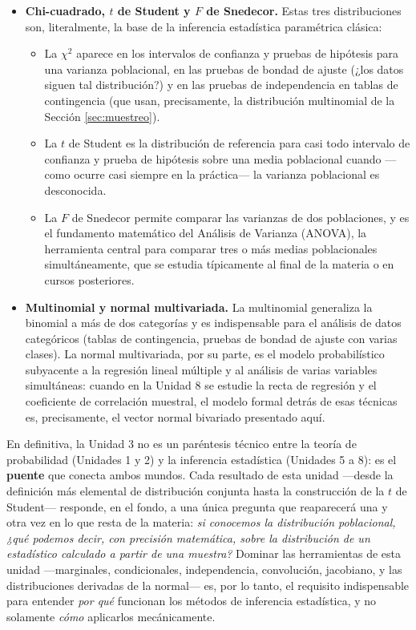 \documentclass[11pt,a4paper]{article}
\theoremstyle{plain}
\theoremstyle{definition}
\theoremstyle{remark}
\begin{document}
\begin{itemize}
\item \textbf{Chi-cuadrado, $t$ de Student y $F$ de Snedecor.} Estas tres distribuciones son, literalmente, la base de la inferencia estadística paramétrica clásica:
\begin{itemize}
\item La $\chi^2$ aparece en los intervalos de confianza y pruebas de hipótesis para una varianza poblacional, en las pruebas de bondad de ajuste (¿los datos siguen tal distribución?) y en las pruebas de independencia en tablas de contingencia (que usan, precisamente, la distribución multinomial de la Sección \ref{sec:muestreo}).
\item La $t$ de Student es la distribución de referencia para casi todo intervalo de confianza y prueba de hipótesis sobre una media poblacional cuando —como ocurre casi siempre en la práctica— la varianza poblacional es desconocida.
\item La $F$ de Snedecor permite comparar las varianzas de dos poblaciones, y es el fundamento matemático del Análisis de Varianza (ANOVA), la herramienta central para comparar tres o más medias poblacionales simultáneamente, que se estudia típicamente al final de la materia o en cursos posteriores.
\end{itemize}

\item \textbf{Multinomial y normal multivariada.} La multinomial generaliza la binomial a más de dos categorías y es indispensable para el análisis de datos categóricos (tablas de contingencia, pruebas de bondad de ajuste con varias clases). La normal multivariada, por su parte, es el modelo probabilístico subyacente a la regresión lineal múltiple y al análisis de varias variables simultáneas: cuando en la Unidad 8 se estudie la recta de regresión y el coeficiente de correlación muestral, el modelo formal detrás de esas técnicas es, precisamente, el vector normal bivariado presentado aquí.
\end{itemize}

En definitiva, la Unidad 3 no es un paréntesis técnico entre la teoría de probabilidad (Unidades 1 y 2) y la inferencia estadística (Unidades 5 a 8): es el \textbf{puente} que conecta ambos mundos. Cada resultado de esta unidad —desde la definición más elemental de distribución conjunta hasta la construcción de la $t$ de Student— responde, en el fondo, a una única pregunta que reaparecerá una y otra vez en lo que resta de la materia: \emph{si conocemos la distribución poblacional, ¿qué podemos decir, con precisión matemática, sobre la distribución de un estadístico calculado a partir de una muestra?} Dominar las herramientas de esta unidad —marginales, condicionales, independencia, convolución, jacobiano, y las distribuciones derivadas de la normal— es, por lo tanto, el requisito indispensable para entender \emph{por qué} funcionan los métodos de inferencia estadística, y no solamente \emph{cómo} aplicarlos mecánicamente.
\end{document}

